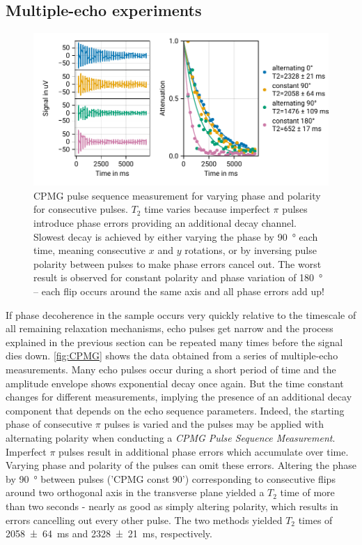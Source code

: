 \documentclass[
    parskip=half, 
    twoside=false,
    twocolumn=true,
    fontsize=11pt,
]{scrarticle}
\begin{document}
\subsection{Multiple-echo experiments}
\begin{figure}
    \centering
    \includegraphics{figures/05 CPMG.pdf}
    \caption{CPMG pulse sequence measurement for varying phase and polarity for consecutive pulses. $T_2$ time varies because imperfect $\pi$ pulses introduce phase errors providing an additional decay channel. Slowest decay is achieved by either varying the phase by \SI{90}{\degree} each time, meaning consecutive $x$ and $y$ rotations, or by inversing pulse polarity between pulses to make phase errors cancel out. The worst result is observed for constant polarity and phase variation of \SI{180}{\degree} -- each flip occurs around the same axis and all phase errors add up!}
    \label{fig:CPMG}
\end{figure}
If phase decoherence in the sample occurs very quickly relative to the timescale of all remaining relaxation mechanisms, echo pulses get narrow and the process explained in the previous section can be repeated many times before the signal dies down. \autoref{fig:CPMG} shows the data obtained from a series of multiple-echo measurements. Many echo pulses occur during a short period of time and the amplitude envelope shows exponential decay once again. But the time constant changes for different measurements, implying the presence of an additional decay component that depends on the echo sequence parameters. Indeed, the starting phase of consecutive $\pi$ pulses is varied and the pulses may be applied with alternating polarity when conducting a \textit{CPMG Pulse Sequence Measurement}. Imperfect $\pi$ pulses result in additional phase errors which accumulate over time. Varying phase and polarity of the pulses can omit these errors. Altering the phase by \SI{90}{\degree} between pulses ('CPMG const 90') corresponding to consecutive flips around two orthogonal axis in the transverse plane yielded a $T_2$ time of more than two seconds - nearly as good as simply altering polarity, which results in errors cancelling out every other pulse. The two methods yielded $T_2$ times of \SI{2058 \pm 64}{\milli \second} and \SI{2328 \pm 21}{\milli \second}, respectively.
\end{document}
